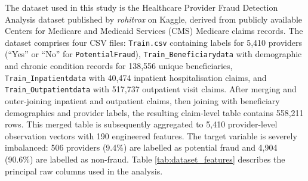 The dataset used in this study is the Healthcare Provider Fraud Detection Analysis
dataset published by \textit{rohitrox} on Kaggle, derived from publicly available
Centers for Medicare and Medicaid Services (CMS) Medicare claims records. The
dataset comprises four CSV files: \texttt{Train.csv} containing labels for 5,410
providers (``Yes'' or ``No'' for \texttt{PotentialFraud}),
\texttt{Train\_Beneficiarydata} with demographic and chronic condition records for
138,556 unique beneficiaries, \texttt{Train\_Inpatientdata} with 40,474 inpatient
hospitalisation claims, and \texttt{Train\_Outpatientdata} with 517,737 outpatient
visit claims. After merging and outer-joining inpatient and outpatient claims, then
joining with beneficiary demographics and provider labels, the resulting
claim-level table contains 558,211 rows. This merged table is subsequently
aggregated to 5,410 provider-level observation vectors with 190 engineered
features. The target variable is severely imbalanced: 506 providers (9.4\%) are
labelled as potential fraud and 4,904 (90.6\%) are labelled as non-fraud. Table
\ref{tab:dataset_features} describes the principal raw columns used in the
analysis.


